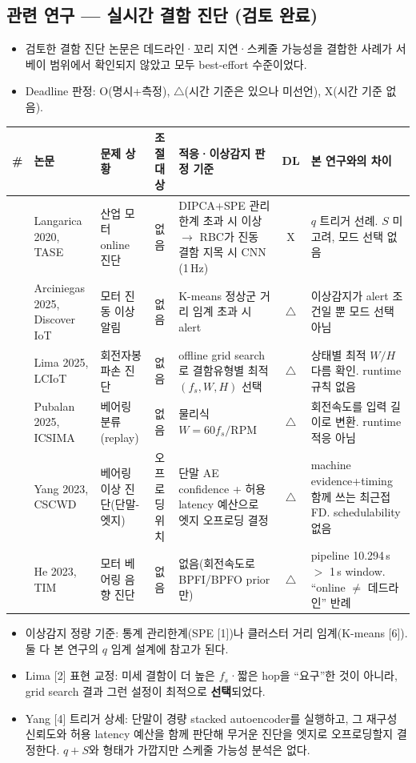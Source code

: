 \documentclass[10pt]{article}
\begin{document}
\subsection{관련 연구 --- 실시간 결함 진단 (검토 완료)}
\begin{itemize}
\item 검토한 결함 진단 논문은 데드라인·꼬리 지연·스케줄 가능성을 결합한 사례가 서베이 범위에서 확인되지 않았고 모두 best-effort 수준이었다.
\item Deadline 판정: O(명시+측정), $\triangle$(시간 기준은 있으나 미선언), X(시간 기준 없음).
\end{itemize}
\begin{center}\scriptsize
\begin{tabular}{@{}cL{2.4cm}L{2.6cm}L{1.6cm}L{4.2cm}cL{3.2cm}@{}}
\toprule
\# & 논문 & 문제 상황 & 조절 대상 & 적응·이상감지 판정 기준 & DL & 본 연구와의 차이 \\ \midrule
[1] & Langarica 2020, TASE & 산업 모터 online 진단 & 없음 & DIPCA+SPE 관리한계 초과 시 이상 $\rightarrow$ RBC가 진동 결함 지목 시 CNN (1\,Hz) & X & $q$ 트리거 선례. $S$ 미고려, 모드 선택 없음 \\
[6] & Arciniegas 2025, Discover IoT & 모터 진동 이상 알림 & 없음 & K-means 정상군 거리 임계 초과 시 alert & $\triangle$ & 이상감지가 alert 조건일 뿐 모드 선택 아님 \\
[2] & Lima 2025, LCIoT & 회전자봉 파손 진단 & 없음 & offline grid search로 결함유형별 최적 $(f_s,W,H)$ 선택 & $\triangle$ & 상태별 최적 $W/H$ 다름 확인. runtime 규칙 없음 \\
[3] & Pubalan 2025, ICSIMA & 베어링 분류(replay) & 없음 & 물리식 $W=60 f_s/\mathrm{RPM}$ & $\triangle$ & 회전속도를 입력 길이로 변환. runtime 적응 아님 \\
[4] & Yang 2023, CSCWD & 베어링 이상 진단(단말-엣지) & 오프로딩 위치 & 단말 AE confidence + 허용 latency 예산으로 엣지 오프로딩 결정 & $\triangle$ & machine evidence+timing 함께 쓰는 최근접 FD. schedulability 없음 \\
[5] & He 2023, TIM & 모터 베어링 음향 진단 & 없음 & 없음(회전속도로 BPFI/BPFO prior만) & $\triangle$ & pipeline 10.294\,s $>$ 1\,s window. ``online $\ne$ 데드라인'' 반례 \\
\bottomrule
\end{tabular}
\end{center}
\begin{itemize}
\item 이상감지 정량 기준: 통계 관리한계(SPE [1])나 클러스터 거리 임계(K-means [6]). 둘 다 본 연구의 $q$ 임계 설계에 참고가 된다.
\item Lima [2] 표현 교정: 미세 결함이 더 높은 $f_s$·짧은 hop을 ``요구''한 것이 아니라, grid search 결과 그런 설정이 최적으로 \textbf{선택}되었다.
\item Yang [4] 트리거 상세: 단말이 경량 stacked autoencoder를 실행하고, 그 재구성 신뢰도와 허용 latency 예산을 함께 판단해 무거운 진단을 엣지로 오프로딩할지 결정한다. $q+S$와 형태가 가깝지만 스케줄 가능성 분석은 없다.
\end{itemize}
\end{document}
